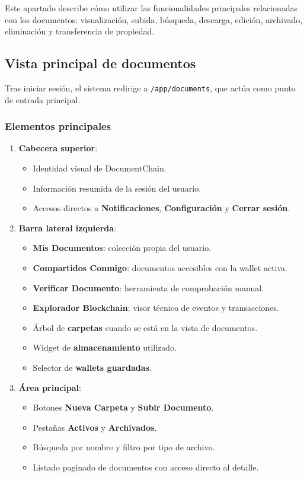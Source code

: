 \documentclass[11pt, a4paper]{article}
\begin{document}
Este apartado describe c\'{o}mo utilizar las funcionalidades principales relacionadas con los documentos: visualizaci\'{o}n, subida, b\'{u}squeda, descarga, edici\'{o}n, archivado, eliminaci\'{o}n y transferencia de propiedad.

\subsection{Vista principal de documentos}

Tras iniciar sesi\'{o}n, el sistema redirige a \texttt{/app/documents}, que act\'{u}a como punto de entrada principal.

\subsubsection{Elementos principales}

\begin{enumerate}
    \item \textbf{Cabecera superior}:
    \begin{itemize}
        \item Identidad visual de DocumentChain.
        \item Informaci\'{o}n resumida de la sesi\'{o}n del usuario.
        \item Accesos directos a \textbf{Notificaciones}, \textbf{Configuraci\'{o}n} y \textbf{Cerrar sesi\'{o}n}.
    \end{itemize}
    \item \textbf{Barra lateral izquierda}:
    \begin{itemize}
        \item \textbf{Mis Documentos}: colecci\'{o}n propia del usuario.
        \item \textbf{Compartidos Conmigo}: documentos accesibles con la wallet activa.
        \item \textbf{Verificar Documento}: herramienta de comprobaci\'{o}n manual.
        \item \textbf{Explorador Blockchain}: visor t\'{e}cnico de eventos y transacciones.
        \item \'{A}rbol de \textbf{carpetas} cuando se est\'{a} en la vista de documentos.
        \item Widget de \textbf{almacenamiento} utilizado.
        \item Selector de \textbf{wallets guardadas}.
    \end{itemize}
    \item \textbf{Área principal}:
    \begin{itemize}
        \item Botones \textbf{Nueva Carpeta} y \textbf{Subir Documento}.
        \item Pesta\~{n}as \textbf{Activos} y \textbf{Archivados}.
        \item B\'{u}squeda por nombre y filtro por tipo de archivo.
        \item Listado paginado de documentos con acceso directo al detalle.
    \end{itemize}
\end{enumerate}
\end{document}
